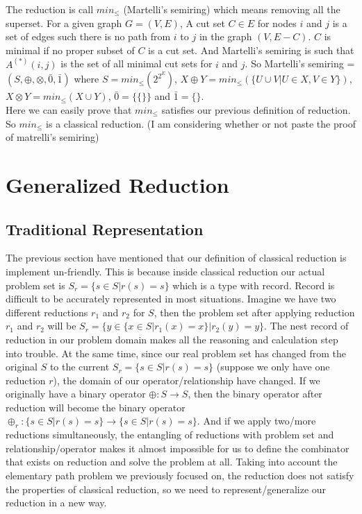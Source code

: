 \documentclass[a4paper,10pt]{article}
\begin{document}
The reduction is call $min_{\leq}$ (Martelli’s semiring)\cite{martelli_gaussian_1976} which means removing all the superset.
For a given graph $G = (V,E)$, A cut set $C \in E$ for nodes $i$ and $j$ is a set of edges such there is no path from $i$ to $j$ in the graph $(V, E - C)$. $C$ is minimal if no proper subset of $C$ is a cut set. And Martelli’s semiring is such that $A^{(*)}(i, j)$ is the set of all minimal cut sets for $i$ and $j$. 
So Martelli’s semiring =$(S,\oplus,\otimes,\bar0,\bar1)$ where $S = min_\leq(2^{2^E})$, $X\oplus Y = min_\leq(\{U \cup V | U \in X, V \in Y\})$, $X\otimes Y = min_\leq(X \cup Y)$, $\bar0 = \{\{\}\}$ and $\bar1 = \{\}$.\\
Here we can easily prove that $min_\leq$ satisfies our previous definition of reduction. So $min_\leq$ is a classical reduction. (I am considering whether or not paste the proof of matrelli's semiring)
\section{Generalized Reduction}
\subsection{Traditional Representation}
The previous section have mentioned that our definition of classical reduction is implement un-friendly.
This is because inside classical reduction our actual problem set is $S_r = \{s\in S|r(s)= s\}$ which is a type with record. Record is difficult to be accurately represented in most situations. 
Imagine we have two different reductions $r_1$ and $r_2$ for $S$, then the problem set after applying reduction $r_1$ and $r_2$ will be $S_r = \{y\in \{x \in S | r_1(x) = x\}|r_2(y)= y\}$. 
The nest record of reduction in our problem domain makes all the reasoning and calculation step into trouble. 
At the same time, since our real problem set has changed from the original $S$ to the current $S_r = \{s\in S|r(s)= s\}$ (suppose we only have one reduction $r$), the domain of our operator/relationship have changed. If we originally have a binary operator $\oplus : S \rightarrow S$, then the binary operator after reduction will become the binary operator $\oplus_r : \{s\in S|r(s)= s\} \rightarrow \{s\in S|r(s)= s\}$. And if we apply two/more reductions simultaneously, the entangling of reductions with problem set and relationship/operator makes it almost impossible for us to define the combinator that exists on reduction and solve the problem at all. 
Taking into account the elementary path problem we previously focused on, the reduction does not satisfy the properties of classical reduction, so we need to represent/generalize our reduction in a new way.\\
\end{document}
